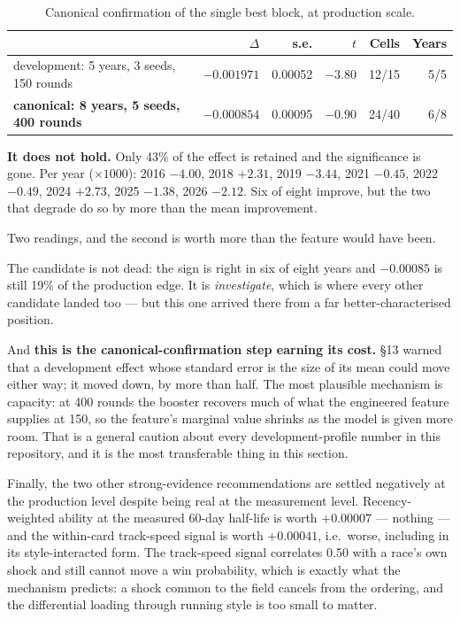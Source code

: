 \documentclass[11pt,a4paper]{article}
\newcommand{\bad}[1]{\textcolor{warm}{\textbf{#1}}}
\begin{document}
\begin{table}[htbp]\centering\small
\caption{Canonical confirmation of the single best block, at production scale.}
\begin{tabular}{lrrrrr}
\toprule
& $\Delta$ & s.e. & $t$ & Cells & Years\\
\midrule
development: 5 years, 3 seeds, 150 rounds & $-0.001971$ & 0.00052 & $-3.80$ & 12/15 & 5/5\\
\textbf{canonical: 8 years, 5 seeds, 400 rounds} & \textbf{$-0.000854$} & 0.00095 & \bad{$-0.90$} & 24/40 & 6/8\\
\bottomrule
\end{tabular}
\end{table}

\textbf{It does not hold.} Only 43\% of the effect is retained and the significance
is gone. Per year ($\times1000$): 2016 $-4.00$, 2018 \bad{$+2.31$}, 2019 $-3.44$,
2021 $-0.45$, 2022 $-0.49$, 2024 \bad{$+2.73$}, 2025 $-1.38$, 2026 $-2.12$. Six of
eight improve, but the two that degrade do so by more than the mean improvement.

Two readings, and the second is worth more than the feature would have been.

The candidate is not dead: the sign is right in six of eight years and $-0.00085$
is still 19\% of the production edge. It is \emph{investigate}, which is where every
other candidate landed too --- but this one arrived there from a far
better-characterised position.

And \textbf{this is the canonical-confirmation step earning its cost.} \S13 warned
that a development effect whose standard error is the size of its mean could move
either way; it moved down, by more than half. The most plausible mechanism is
capacity: at 400 rounds the booster recovers much of what the engineered feature
supplies at 150, so the feature's marginal value shrinks as the model is given more
room. That is a general caution about every development-profile number in this
repository, and it is the most transferable thing in this section.

Finally, the two other strong-evidence recommendations are settled negatively at
the production level despite being real at the measurement level. Recency-weighted
ability at the measured 60-day half-life is worth $+0.00007$ --- nothing --- and the
within-card track-speed signal is worth $+0.00041$, i.e.\ worse, including in its
style-interacted form. The track-speed signal correlates 0.50 with a race's own
shock and still cannot move a win probability, which is exactly what the mechanism
predicts: a shock common to the field cancels from the ordering, and the
differential loading through running style is too small to matter.
\end{document}
